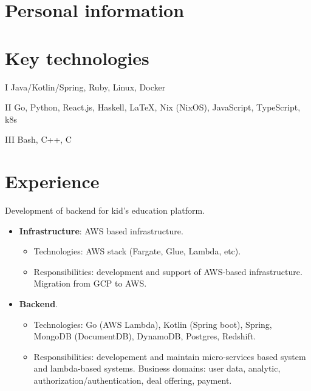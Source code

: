 \documentclass{cv}
\begin{document}
\iftrue

	\section{Personal information}




\fi


\section{Key technologies}

\begin{cvblock}{I}
	Java/Kotlin/Spring, Ruby, Linux, Docker
\end{cvblock}

\begin{cvblock}{II}
	Go, Python, React.js, Haskell, \LaTeX, Nix (NixOS), JavaScript, TypeScript, k8s
\end{cvblock}

\begin{cvblock}{III}
	Bash, C++, C
\end{cvblock}


\section{Experience}

\begin{cvblock}{%
		}

	Development of backend for kid's education platform.

	\begin{itemize}
		\item \textbf{Infrastructure}: AWS based infrastructure.
		      \begin{itemize}
			      \item Technologies: AWS stack (Fargate, Glue, Lambda, etc).
			      \item Responsibilities: development and support of AWS-based infrastructure. Migration from GCP to AWS.
		      \end{itemize}
		\item \textbf{Backend}.
		      \begin{itemize}
			      \item Technologies: Go (AWS Lambda), Kotlin (Spring boot), Spring, MongoDB (DocumentDB), DynamoDB, Postgres, Redshift.
			      \item Responsibilities: developement and maintain micro-services based system and lambda-based systems. Business domains:
			            user data, analytic, authorization/authentication, deal offering, payment.
		      \end{itemize}
	\end{itemize}
\end{cvblock}
\end{document}
